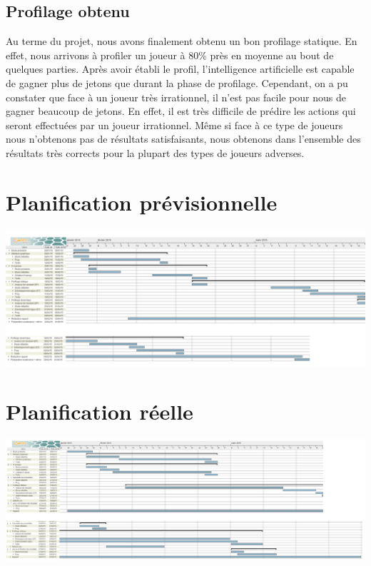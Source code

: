 \documentclass{report}
\begin{document}
\section{Profilage obtenu}
\hspace{0.5cm}Au terme du projet, nous avons finalement obtenu un bon profilage statique. En effet, nous arrivons à profiler un joueur à 80\% près en moyenne au bout de quelques parties. Après avoir établi le profil, l'intelligence artificielle est capable de gagner plus de jetons que durant la phase de profilage. Cependant, on a pu constater que face à un joueur très irrationnel, il n'est pas facile pour nous de gagner beaucoup de jetons. En effet, il est très difficile de prédire les actions qui seront effectuées par un joueur irrationnel. Même si face à ce type de joueurs nous n'obtenons pas de résultats satisfaisants, nous obtenons dans l'ensemble des résultats très corrects pour la plupart des types de joueurs adverses.\par







\nocite{*}


\appendix
\chapter{Planification prévisionnelle}
		 \hspace{-4.2cm} 
			\includegraphics[scale=0.28]{../DiagrammePrevisionnel.png}
	\medskip
		
\chapter{Planification réelle}
		 \hspace{-4.5cm} 
			\includegraphics[scale=0.24]{../DiagrammeReel.png}

	\medskip
		
		
		
\end{document}
